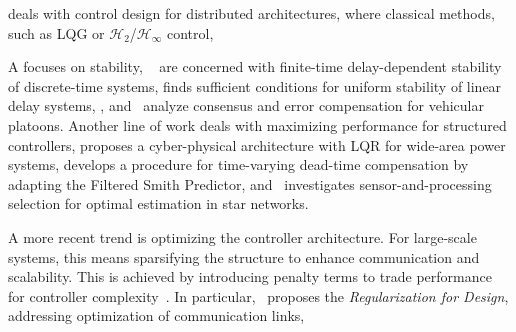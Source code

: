 
 deals with control design for
distributed architectures,
where classical methods,
such as LQG or $ \mathcal{H}_2 $/$ \mathcal{H}_{\infty} $ control,

A  focuses on stability,
\eg~\cite{ren2017finite,SUN2021419} are concerned with finite-time delay-dependent stability of
discrete-time systems,
\cite{BEREZANSKY2015605} finds sufficient conditions for uniform stability
of linear delay systems,
,
and~\cite{Chehardoli2019,8844785} analyze consensus and error compensation for vehicular platoons.
Another line of work deals with maximizing performance for structured controllers,
\cite{SOUDBAKHSH2017171} proposes a cyber-physical architecture with LQR for wide-area power systems,
\cite{MORATO202178} develops a procedure for time-varying dead-time compensation
by adapting the Filtered Smith Predictor,
and~\cite{9137405} investigates sensor-and-processing selection for optimal estimation in star networks.

A more recent trend is optimizing the controller architecture.
For large-scale systems,
this means sparsifying the structure
to enhance communication and scalability.
This is achieved by introducing penalty terms %
to trade performance for controller complexity~\cite{6497509,dorjovchebulTPS14,7835692,9216852,7347386,BAHAVARNIA201710395,7378905,ANDERSON2019364}.
In particular,~\cite{7378905} proposes the \textit{Regularization for Design},
addressing optimization of communication links,

